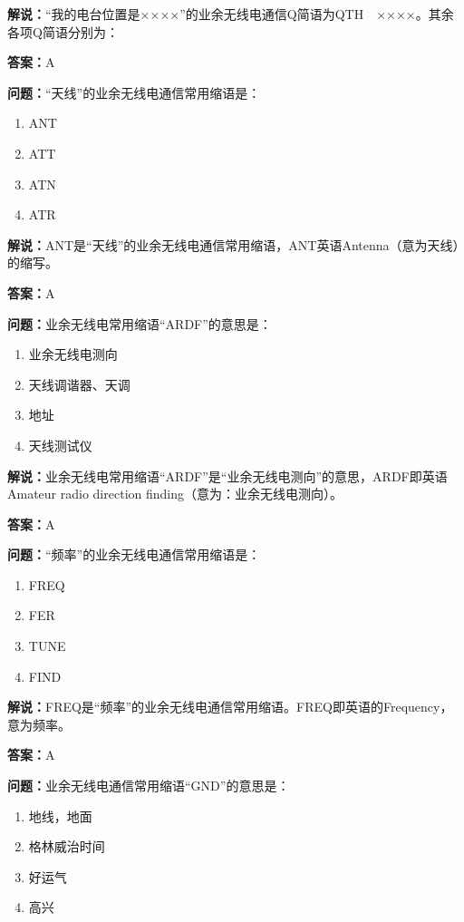 \textbf{解说：}“我的电台位置是××××”的业余无线电通信Q简语为QTH　××××。其余各项Q简语分别为：

\textbf{答案：}A

\textbf{问题：}“天线”的业余无线电通信常用缩语是：

\begin{enumerate}[label=\Alph*), leftmargin=1cm]
	\item ANT
	\item ATT
	\item ATN
	\item ATR
\end{enumerate}

\textbf{解说：}ANT是“天线”的业余无线电通信常用缩语，ANT英语Antenna（意为天线）的缩写。

\textbf{答案：}A

\textbf{问题：}业余无线电常用缩语“ARDF”的意思是：

\begin{enumerate}[label=\Alph*), leftmargin=1cm]
	\item 业余无线电测向
	\item 天线调谐器、天调
	\item 地址
	\item 天线测试仪
\end{enumerate}

\textbf{解说：}业余无线电常用缩语“ARDF”是“业余无线电测向”的意思，ARDF即英语Amateur radio direction finding（意为：业余无线电测向）。

\textbf{答案：}A

\textbf{问题：}“频率”的业余无线电通信常用缩语是：
\begin{enumerate}[label=\Alph*), leftmargin=1cm]
	\item FREQ
	\item FER
	\item TUNE
	\item FIND
\end{enumerate}

\textbf{解说：}FREQ是“频率”的业余无线电通信常用缩语。FREQ即英语的Frequency，意为频率。

\textbf{答案：}A

\textbf{问题：}业余无线电通信常用缩语“GND”的意思是：

\begin{enumerate}[label=\Alph*), leftmargin=1cm]
	\item 地线，地面
	\item 格林威治时间
	\item 好运气
	\item 高兴
\end{enumerate}

